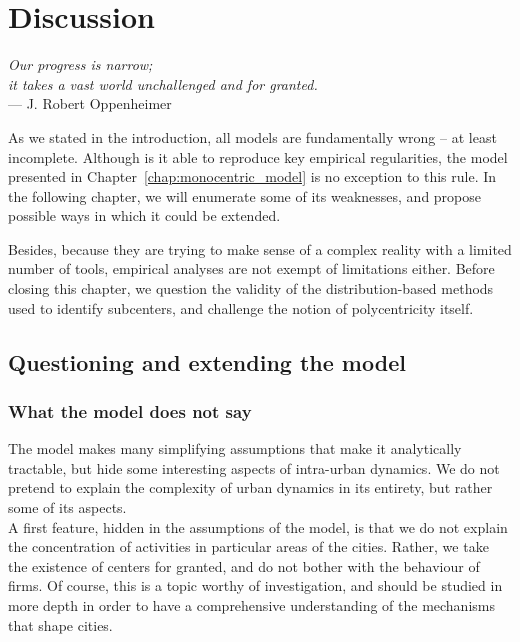 \chapter{Discussion}
\label{chap:monocentric_discussion}

\begin{flushright}{\slshape    
Our progress is narrow;\\
it takes a vast world unchallenged and for granted.}  \\ \medskip
--- J. Robert Oppenheimer~\cite{Oppenheimer:1954}
\end{flushright}


\bigskip

As we stated in the introduction, all models are fundamentally wrong -- at least
incomplete. Although is it able to reproduce key empirical regularities, the
model presented in Chapter~\ref{chap:monocentric_model} is no exception to this
rule. In the following chapter, we will enumerate some of its weaknesses, and
propose possible ways in which it could be extended.

Besides, because they are trying to make sense of a complex reality with a limited number
of tools, empirical analyses are not exempt of limitations either. Before
closing this chapter, we question the validity of the distribution-based methods used to
identify subcenters, and challenge the notion of polycentricity itself.

\section{Questioning and extending the model}
\label{sec:model}

\subsection{What the model does not say}
\label{sec:what_the_model_does_not_say}

The model makes many simplifying assumptions that make it
analytically tractable, but hide some interesting aspects of intra-urban
dynamics. We do not pretend to explain the complexity of
urban dynamics in its entirety, but rather some of its aspects.\\ 

A first feature, hidden in the assumptions of the model, is that we do not
explain the concentration of activities in particular areas of the cities.
Rather, we take the existence of centers for granted, and do not bother with the
behaviour of firms. Of course, this is a topic worthy of investigation, and
should be studied in more depth in order to have a comprehensive understanding
of the mechanisms that shape cities.

